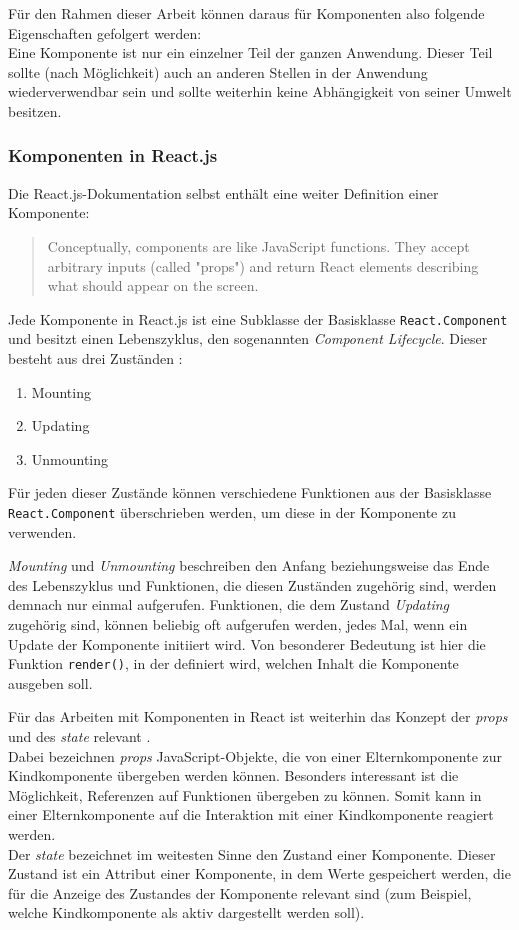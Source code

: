 Für den Rahmen dieser Arbeit können daraus für Komponenten also folgende Eigenschaften gefolgert werden:\\
Eine Komponente ist nur ein einzelner Teil der ganzen Anwendung. Dieser Teil sollte (nach Möglichkeit) auch an anderen Stellen in der Anwendung wiederverwendbar sein und sollte weiterhin keine Abhängigkeit von seiner Umwelt besitzen.

\subsubsection{Komponenten in React.js}
Die React.js-Dokumentation selbst enthält eine weiter Definition einer Komponente:

\begin{quote}
  Conceptually, components are like JavaScript functions. They accept arbitrary inputs (called "props") and return React elements describing what should appear on the screen. \cite{ReactProps}
\end{quote}

Jede Komponente in React.js ist eine Subklasse der Basisklasse \verb|React.Component| und besitzt einen Lebenszyklus, den sogenannten \textit{Component Lifecycle}. Dieser besteht aus drei Zuständen \cite{ReactCom}:

\begin{enumerate}
  \item Mounting
  \item Updating
  \item Unmounting
\end{enumerate}

Für jeden dieser Zustände können verschiedene Funktionen aus der Basisklasse \verb|React.Component| überschrieben werden, um diese in der Komponente zu verwenden.

\textit{Mounting} und \textit{Unmounting} beschreiben den Anfang beziehungsweise das Ende des Lebenszyklus und Funktionen, die diesen Zuständen zugehörig sind, werden demnach nur einmal aufgerufen.
Funktionen, die  dem Zustand \textit{Updating} zugehörig sind, können beliebig oft aufgerufen werden, jedes Mal, wenn ein Update der Komponente initiiert wird. Von besonderer Bedeutung ist hier die Funktion \verb|render()|, in der definiert wird, welchen Inhalt die Komponente ausgeben soll.

Für das Arbeiten mit Komponenten in React ist weiterhin das Konzept der \textit{props} und des \textit{state} relevant \cite{ReactProps}.\\
Dabei bezeichnen \textit{props} JavaScript-Objekte, die von einer Elternkomponente zur Kindkomponente übergeben werden können. Besonders interessant ist die Möglichkeit, Referenzen auf Funktionen übergeben zu können. Somit kann in einer Elternkomponente auf die Interaktion mit einer Kindkomponente reagiert werden.\\
Der \textit{state} bezeichnet im weitesten Sinne den Zustand einer Komponente. Dieser Zustand ist ein Attribut einer Komponente, in dem Werte gespeichert werden, die für die Anzeige des Zustandes der Komponente relevant sind (zum Beispiel, welche Kindkomponente als aktiv dargestellt werden soll).\\

